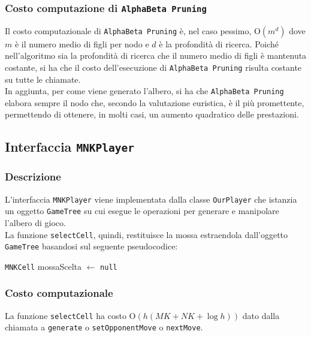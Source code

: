 \documentclass[11pt]{article}
\begin{document}
\subsubsection*{Costo computazione di \texttt{AlphaBeta Pruning}}
Il costo computazionale di \texttt{AlphaBeta Pruning} è, nel caso pessimo, O$(m^d)$ dove $m$ è il numero medio di figli per nodo e $d$ è la profondità di ricerca. Poiché nell'algoritmo sia la profondità di ricerca che il numero medio di figli è mantenuta costante, si ha che il costo dell'esecuzione di \texttt{AlphaBeta Pruning} risulta costante su tutte le chiamate.\\
In aggiunta, per come viene generato l'albero, si ha che \texttt{AlphaBeta Pruning} elabora sempre il nodo che, secondo la valutazione euristica, è il più promettente, permettendo di ottenere, in molti casi, un aumento quadratico delle prestazioni.

\subsection*{Interfaccia \texttt{MNKPlayer}}
\subsubsection*{Descrizione}
L'interfaccia \texttt{MNKPlayer} viene implementata dalla classe \texttt{OurPlayer} che istanzia un oggetto \texttt{GameTree} su cui esegue le operazioni per generare e manipolare l'albero di gioco.\\
La funzione \texttt{selectCell}, quindi, restituisce la mossa estraendola dall'oggetto \texttt{GameTree} basandosi sul seguente pseudocodice:
\begin{algorithm*}
\SetAlgoLined
\texttt{MNKCell} mossaScelta $\gets$ \texttt{null}\\
\vspace{0.2cm}
\end{algorithm*}
\vspace{-0.7cm}
\subsubsection*{Costo computazionale}
La funzione \texttt{selectCell} ha costo O$(h(MK+NK+\log h))$ dato dalla chiamata a \texttt{generate} o \texttt{setOpponentMove} o \texttt{nextMove}.
\end{document}

